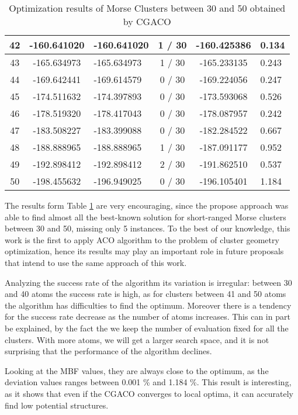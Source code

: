 \begin{table}[!htbp]
\begin{center}
\begin{tabular}{| c | c | p{3cm} | c | c | p{2cm} |}
				42 & -160.641020 & -160.641020 & 1 / 30 & -160.425386 & 0.134 \\ \hline
				43 & -165.634973 & -165.634973 & 1 / 30 & -165.233135 & 0.243 \\ \hline
				44 & -169.642441 & -169.614579 & 0 / 30 & -169.224056 & 0.247 \\ \hline
				45 & -174.511632 & -174.397893 & 0 / 30 & -173.593068 & 0.526 \\ \hline
				46 & -178.519320 & -178.417043 & 0 / 30 & -178.087957 & 0.242 \\ \hline
				47 & -183.508227 & -183.399088 & 0 / 30 & -182.284522 & 0.667 \\ \hline
				48 & -188.888965 & -188.888965 & 1 / 30 & -187.091177 & 0.952 \\ \hline
				49 & -192.898412 & -192.898412 & 2 / 30 & -191.862510 & 0.537 \\ \hline
				50 & -198.455632 & -196.949025 & 0 / 30 & -196.105401 & 1.184 \\ \hline
			\end{tabular}
		\caption{Optimization results of Morse Clusters between 30 and 50 obtained by CGACO}
		\label{tab:optimization_results}
		\end{center}
	\end{table}
	
	The results form Table \ref{tab:optimization_results} are very encouraging, since the propose approach was able to find almost all the best-known solution for short-ranged Morse clusters between 30 and 50, missing only 5 instances.
	To the best of our knowledge, this work is the first to apply ACO algorithm to the problem of cluster geometry optimization, hence its results may play an important role in future proposals that intend to use the same approach of this work.
	
	Analyzing the success rate of the algorithm its variation is irregular: between 30 and 40 atoms the success rate is high, as for clusters between 41 and 50 atoms the algorithm has difficulties to find the optimum. Moreover there is a tendency for the success rate decrease as the number of atoms increases. This can in part be explained, by the fact the we keep the number of evaluation fixed for all the clusters. With more atoms, we will get a larger search space, and it is not surprising that the performance of the algorithm declines.
	
	Looking at the MBF values, they are always close to the optimum, as the deviation values ranges between 0.001 \% and 1.184 \%. This result is interesting, as it shows that even if the CGACO converges to local optima, it can accurately find low potential structures.
	
